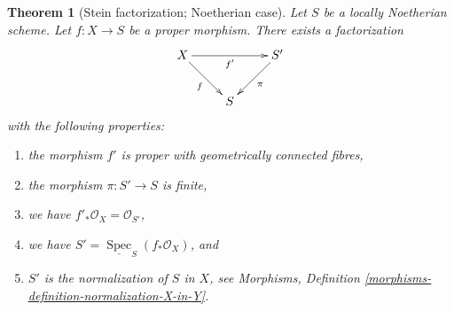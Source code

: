 \documentclass{amsart}
\theoremstyle{plain}
\newtheorem{theorem}[subsection]{Theorem}
\theoremstyle{definition}
\theoremstyle{remark}
\numberwithin{equation}{subsection}
\def\Spec{\mathop{\mathrm{Spec}}}
\begin{document}
\begin{theorem}[Stein factorization; Noetherian case]
\label{theorem-stein-factorization-Noetherian}
Let $S$ be a locally Noetherian scheme.
Let $f : X \to S$ be a proper morphism.
There exists a factorization
$$
\xymatrix{
X \ar[rr]_{f'} \ar[rd]_f & & S' \ar[dl]^\pi \\
& S &
}
$$
with the following properties:
\begin{enumerate}
\item the morphism $f'$ is proper with geometrically connected fibres,
\item the morphism $\pi : S' \to S$ is finite,
\item we have $f'_*\mathcal{O}_X = \mathcal{O}_{S'}$,
\item we have $S' = \underline{\Spec}_S(f_*\mathcal{O}_X)$, and
\item $S'$ is the normalization of $S$ in $X$, see
Morphisms, Definition \ref{morphisms-definition-normalization-X-in-Y}.
\end{enumerate}
\end{theorem}
\end{document}
